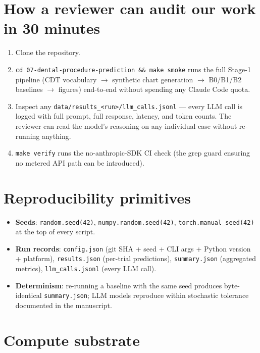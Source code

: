 \documentclass[11pt,letterpaper]{article}
\begin{document}
\section*{How a reviewer can audit our work in 30 minutes}

\begin{enumerate}
    \item Clone the repository.
    \item \texttt{cd 07-dental-procedure-prediction \&\& make smoke}
    runs the full Stage-1 pipeline (CDT vocabulary $\to$ synthetic chart
    generation $\to$ B0/B1/B2 baselines $\to$ figures) end-to-end without
    spending any Claude Code quota.
    \item Inspect any \texttt{data/results\_<run>/llm\_calls.jsonl} ---
    every LLM call is logged with full prompt, full response, latency,
    and token counts. The reviewer can read the model's reasoning on any
    individual case without re-running anything.
    \item \texttt{make verify} runs the no-anthropic-SDK CI check
    (the grep guard ensuring no metered API path can be introduced).
\end{enumerate}

\section*{Reproducibility primitives}

\begin{itemize}\itemsep0pt
    \item \textbf{Seeds}: \texttt{random.seed(42)},
    \texttt{numpy.random.seed(42)}, \texttt{torch.manual\_seed(42)} at the
    top of every script.
    \item \textbf{Run records}: \texttt{config.json} (git SHA + seed +
    CLI args + Python version + platform), \texttt{results.json}
    (per-trial predictions), \texttt{summary.json} (aggregated metrics),
    \texttt{llm\_calls.jsonl} (every LLM call).
    \item \textbf{Determinism}: re-running a baseline with the same seed
    produces byte-identical \texttt{summary.json}; LLM models reproduce
    within stochastic tolerance documented in the manuscript.
\end{itemize}

\section*{Compute substrate}
\end{document}
